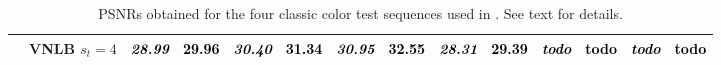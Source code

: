 \documentclass[10pt, journal, twocolumn, final, a4paper]{IEEEtran}
\newcommand{\best}[1]{#1}
\newcommand{\bsic}[1]{\textcolor{black}{\textit{#1}}}
\newcommand{\Bsic}[1]{\textcolor{black}{\textbf{\textit{#1}}}}
\newcommand{\Best}[1]{\textbf{\textcolor{black}{#1}}}
\begin{document}
\begin{table}[htp!]
\begin{center}
{\begin{tabular}{ c | l |c c | c c | c c | c c | c c | c c}
			                      & VNLB   $s_t = 4$     & \Bsic{28.99} & \Best{29.96} & \Bsic{30.40} & \Best{31.34} & \Bsic{30.95} & \Best{32.55} & \Bsic{28.31} & \Best{29.39} & \Bsic{todo } & \Best{todo } & \Bsic{todo } & \Best{todo } \\\hline
		\end{tabular}}
	\end{center}
	\caption{PSNRs obtained for the four classic color test sequences used in
	\cite{Maggioni2012}. See text for details.}
	\label{tab:psnr-classic-color}
\end{table}
\end{document}

